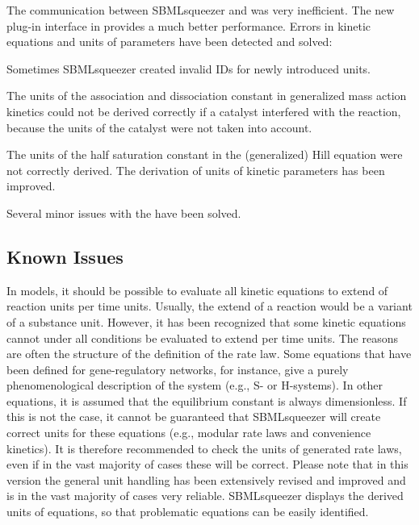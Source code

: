 The communication between SBMLsqueezer and \CellDesigner was very inefficient.
The new plug-in interface in \JSBML provides a much better performance.
Errors in kinetic equations and units of parameters have been detected and
solved:
\begin{dinglist}{54}
\item Sometimes SBMLsqueezer created invalid \acp{ID} for newly introduced
      units.
\item The units of the association and dissociation constant in generalized mass
      action kinetics could not be derived correctly if a catalyst interfered
      with the reaction, because the units of the catalyst were not taken into
      account.
\item The units of the half saturation constant in the (generalized) Hill
      equation were not correctly derived. The derivation of units of kinetic
      parameters has been improved.
\end{dinglist}  
Several minor issues with the \GUI have been solved.

\subsection{Known Issues}

In \SBML models, it should be possible to evaluate all kinetic equations to
extend of reaction units per time units. Usually, the extend of a reaction would
be a variant of a substance unit. However, it has been recognized that some
kinetic equations cannot under all conditions be evaluated to extend per time
units. The reasons are often the structure of the definition of the rate law.
Some equations that have been defined for gene-regulatory networks, for
instance, give a purely phenomenological description of the system (e.g.,
S- or H-systems). In other equations, it is assumed that the equilibrium constant
is always dimensionless. If this is not the case, it cannot be guaranteed that
SBMLsqueezer will create correct units for these equations (e.g., modular rate
laws and convenience kinetics). It is therefore recommended to check the units
of generated rate laws, even if in the vast majority of cases these will be
correct. Please note that in this version the general unit handling has been
extensively revised and improved and is in the vast majority of cases very
reliable. SBMLsqueezer displays the derived units of equations, so that
problematic equations can be easily identified.
